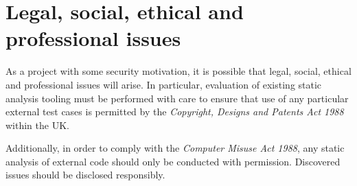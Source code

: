 \documentclass[a4paper]{article}
\begin{document}
    \section*{Legal, social, ethical and professional issues}
    
    As a project with some security motivation, it is possible that legal, social, ethical and professional issues will arise. In particular, evaluation of existing static analysis tooling must be performed with care to ensure that use of any particular external test cases is permitted by the \emph{Copyright, Designs and Patents Act 1988} within the UK.
    
    Additionally, in order to comply with the \emph{Computer Misuse Act 1988}, any static analysis of external code should only be conducted with permission.  Discovered issues should be disclosed responsibly.
    
    



\end{document}
